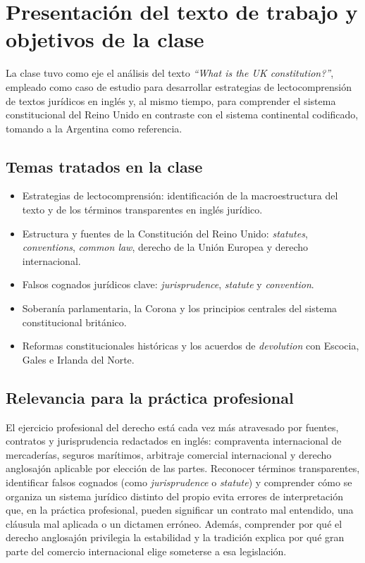 \documentclass[12pt,oneside]{book}
\begin{document}
\chapter{Presentación del texto de trabajo y objetivos de la clase}

La clase tuvo como eje el análisis del texto \emph{``What is the UK constitution?''}, empleado como caso de estudio para desarrollar estrategias de lectocomprensión de textos jurídicos en inglés y, al mismo tiempo, para comprender el sistema constitucional del Reino Unido en contraste con el sistema continental codificado, tomando a la Argentina como referencia.

\section{Temas tratados en la clase}

\begin{itemize}
    \item Estrategias de lectocomprensión: identificación de la macroestructura del texto y de los términos transparentes en inglés jurídico.
    \item Estructura y fuentes de la Constitución del Reino Unido: \emph{statutes}, \emph{conventions}, \emph{common law}, derecho de la Unión Europea y derecho internacional.
    \item Falsos cognados jurídicos clave: \emph{jurisprudence}, \emph{statute} y \emph{convention}.
    \item Soberanía parlamentaria, la Corona y los principios centrales del sistema constitucional británico.
    \item Reformas constitucionales históricas y los acuerdos de \emph{devolution} con Escocia, Gales e Irlanda del Norte.
\end{itemize}

\section{Relevancia para la práctica profesional}

\begin{note}
El ejercicio profesional del derecho está cada vez más atravesado por fuentes, contratos y jurisprudencia redactados en inglés: compraventa internacional de mercaderías, seguros marítimos, arbitraje comercial internacional y derecho anglosajón aplicable por elección de las partes. Reconocer términos transparentes, identificar falsos cognados (como \emph{jurisprudence} o \emph{statute}) y comprender cómo se organiza un sistema jurídico distinto del propio evita errores de interpretación que, en la práctica profesional, pueden significar un contrato mal entendido, una cláusula mal aplicada o un dictamen erróneo. Además, comprender por qué el derecho anglosajón privilegia la estabilidad y la tradición explica por qué gran parte del comercio internacional elige someterse a esa legislación.
\end{note}
\end{document}
